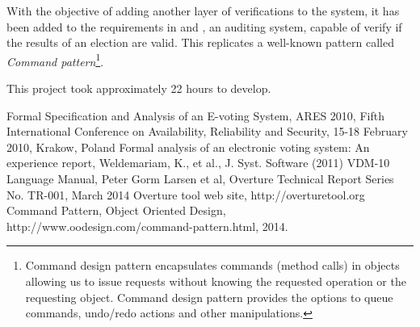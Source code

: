 \documentclass{article}
\begin{document}
With the objective of adding another layer of verifications to the system, it has been added to the requirements in \cite{intro} and \cite{intro2}, an auditing system, capable of verify if the results of an election are valid. This replicates a well-known pattern called \textit{Command pattern}\footnote{Command design pattern encapsulates commands (method calls) in objects allowing us to issue requests without knowing the requested operation or the requesting object. Command design pattern provides the options to queue commands, undo/redo actions and other manipulations\cite{cmd}.}.

This project took approximately 22 hours to develop.


\renewcommand{\refname}{\section{References}} 
\begin{thebibliography}{99}
Formal Specification and Analysis of an E-voting System, ARES 2010, Fifth International Conference on Availability, Reliability and Security, 15-18 February 2010, Krakow, Poland
Formal analysis of an electronic voting system: An experience report, Weldemariam, K., et al., J. Syst. Software (2011)
VDM-10 Language Manual, Peter Gorm Larsen et al, Overture Technical Report Series No. TR-001, March 2014
Overture tool web site, http://overturetool.org 
Command Pattern, Object Oriented Design, http://www.oodesign.com/command-pattern.html, 2014.

\end{thebibliography}
\end{document}
